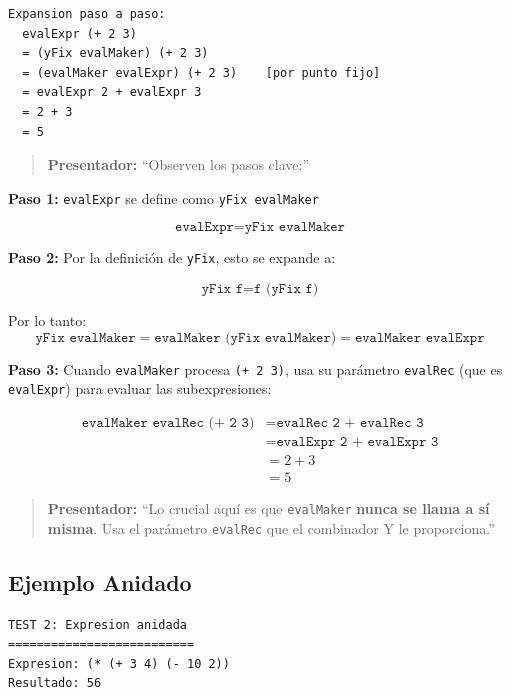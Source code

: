 \documentclass[12pt]{article}
\begin{document}
\begin{verbatim}
Expansion paso a paso:
  evalExpr (+ 2 3)
  = (yFix evalMaker) (+ 2 3)
  = (evalMaker evalExpr) (+ 2 3)    [por punto fijo]
  = evalExpr 2 + evalExpr 3
  = 2 + 3
  = 5
\end{verbatim}

\begin{quote}
\textbf{Presentador:} ``Observen los pasos clave:''
\end{quote}

\textbf{Paso 1:} \texttt{evalExpr} se define como \texttt{yFix evalMaker}

\begin{equation*}
\texttt{evalExpr} = \texttt{yFix evalMaker}
\end{equation*}

\textbf{Paso 2:} Por la definición de \texttt{yFix}, esto se expande a:

\begin{equation*}
\texttt{yFix f} = \texttt{f (yFix f)}
\end{equation*}

Por lo tanto:
\begin{equation*}
\texttt{yFix evalMaker} = \texttt{evalMaker (yFix evalMaker)} = \texttt{evalMaker evalExpr}
\end{equation*}

\textbf{Paso 3:} Cuando \texttt{evalMaker} procesa \texttt{(+ 2 3)}, usa su parámetro \texttt{evalRec} (que es \texttt{evalExpr}) para evaluar las subexpresiones:

\begin{align*}
\texttt{evalMaker evalRec (+ 2 3)} &= \texttt{evalRec 2 + evalRec 3} \\
&= \texttt{evalExpr 2 + evalExpr 3} \\
&= 2 + 3 \\
&= 5
\end{align*}

\begin{quote}
\textbf{Presentador:} ``Lo crucial aquí es que \texttt{evalMaker} \textbf{nunca se llama a sí misma}. Usa el parámetro \texttt{evalRec} que el combinador Y le proporciona.''
\end{quote}

\newpage
\subsection*{Ejemplo Anidado}

\begin{verbatim}
TEST 2: Expresion anidada
==========================
Expresion: (* (+ 3 4) (- 10 2))
Resultado: 56
\end{verbatim}
\end{document}
